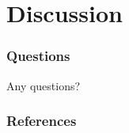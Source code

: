 \documentclass[aspectratio=169]{beamer}
\begin{document}
\section{Discussion}
\begin{frame}[t]
    \frametitle{Questions}
    \vspace{2.0cm}
    \begin{center}
        Any questions?
    \end{center}
\end{frame}
\begin{frame}
    \frametitle{References}
    \printbibliography

\end{frame}
\end{document}
